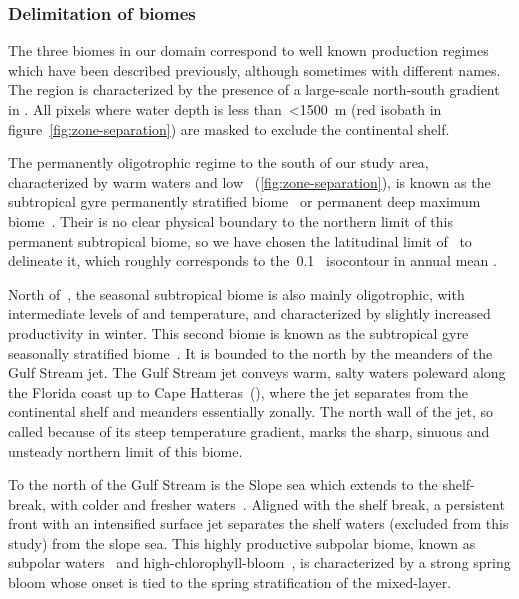 \subsubsection{Delimitation of biomes}

The three biomes in our domain correspond to well known production regimes which have been described previously, although sometimes with different names.
The region is characterized by the presence of a large-scale north-south gradient in .
All pixels where water depth is less than~\qty{<1500}{\m} (red isobath in figure~\ref{fig:zone-separation}) are masked to exclude the continental shelf.

The permanently oligotrophic regime to the south of our study area, characterized by warm waters and low ~(\cref{fig:zone-separation}), is known as the subtropical gyre permanently stratified biome~\parencite{sarmiento_2004} or permanent deep  maximum biome~\parencite{bock_2022}.
Their is no clear physical boundary to the northern limit of this permanent subtropical biome, so we have chosen the latitudinal limit of~ to delineate it, which roughly corresponds to the~\qty{0.1}{\mgm}~ isocontour in annual mean .

North of~, the seasonal subtropical biome is also mainly oligotrophic, with intermediate levels of  and temperature, and characterized by slightly increased productivity in winter.
This second biome is known as the subtropical gyre seasonally stratified biome~\parencite{sarmiento_2004}.
It is bounded to the north by the meanders of the Gulf Stream jet.
The Gulf Stream jet conveys warm, salty waters poleward along the Florida coast up to Cape Hatteras~(), where the jet separates from the continental shelf and meanders essentially zonally.
The north wall of the jet, so called because of its steep temperature gradient, marks the sharp, sinuous and unsteady northern limit of this biome.

To the north of the Gulf Stream is the Slope sea which extends to the shelf-break, with colder and fresher waters~\parencite{linder_1998}.
Aligned with the shelf break, a persistent front with an intensified surface jet separates the shelf waters (excluded from this study) from the slope sea.
This highly productive subpolar biome, known as subpolar waters~\parencite{sarmiento_2004} and high-chlorophyll-bloom~\parencite{bock_2022}, is characterized by a strong spring bloom whose onset is tied to the spring stratification of the mixed-layer.

